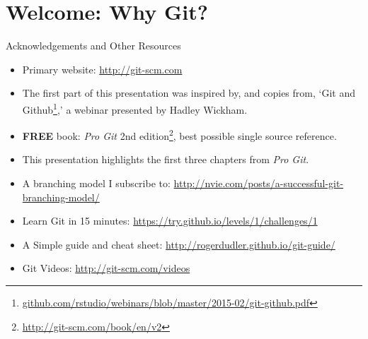   \section{Welcome: Why Git?}
  \begin{frame}[t]{Acknowledgements and Other Resources}

    \begin{itemize}
      \item Primary website: \url{http://git-scm.com}
      \item The first part of this presentation was inspired by, and copies
        from, `Git and
        Github\footnote{\url{github.com/rstudio/webinars/blob/master/2015-02/git-github.pdf}},' a webinar presented by Hadley Wickham.
      \item {\bf FREE} book: {\it Pro Git} 2nd
        edition\footnote{\url{http://git-scm.com/book/en/v2}}, best possible
        single source reference.
      \item This presentation highlights the first three chapters from
        {\it Pro Git}.
      \item A branching model I subscribe to:
        \url{http://nvie.com/posts/a-successful-git-branching-model/}

      \item Learn Git in 15 minutes: 
        \url{https://try.github.io/levels/1/challenges/1}
      \item A Simple guide and cheat sheet: 
        \url{http://rogerdudler.github.io/git-guide/}
      \item Git Videos: \url{http://git-scm.com/videos}

    \end{itemize} 
  \end{frame}


